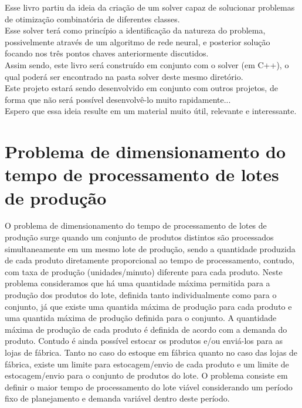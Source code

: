 \documentclass{book}
\begin{document}
Esse livro partiu da ideia da criação de um solver capaz de solucionar problemas de otimização combinatória de diferentes classes. \\

Esse solver terá como princípio a identificação da natureza do problema, possivelmente através de um algoritmo de rede neural, e posterior solução focando nos três pontos chaves anteriormente discutidos. \\

Assim sendo, este livro será construído em conjunto com o solver (em C++), o qual poderá ser encontrado na pasta solver deste mesmo diretório. \\

Este projeto estará sendo desenvolvido em conjunto com outros projetos, de forma que não será possível desenvolvê-lo muito rapidamente... \\

Espero que essa ideia resulte em um material muito útil, relevante e interessante.

\section{Problema de dimensionamento do tempo de processamento de lotes de produção}

O problema de dimensionamento do tempo de processamento de lotes de produção surge quando um conjunto de produtos distintos são processados simultaneamente em um mesmo lote de produção, sendo a quantidade produzida de cada produto diretamente proporcional ao tempo de processamento, contudo, com taxa de produção (unidades/minuto) diferente para cada produto. Neste problema consideramos que há uma quantidade máxima permitida para a produção dos produtos do lote, definida tanto individualmente como para o conjunto, já que existe uma quantida máxima de produção para cada produto e uma quantida máxima de produção definida para o conjunto. A quantidade máxima de produção de cada produto é definida de acordo com a demanda do produto. Contudo é ainda possível estocar os produtos e/ou enviá-los para as lojas de fábrica. Tanto no caso do estoque em fábrica quanto no caso das lojas de fábrica, existe um limite para estocagem/envio de cada produto e um limite de estocagem/envio para o conjunto de produtos do lote. O problema consiste em definir o maior tempo de processamento do lote viável considerando um período fixo de planejamento e demanda variável dentro deste período. \\
\end{document}
